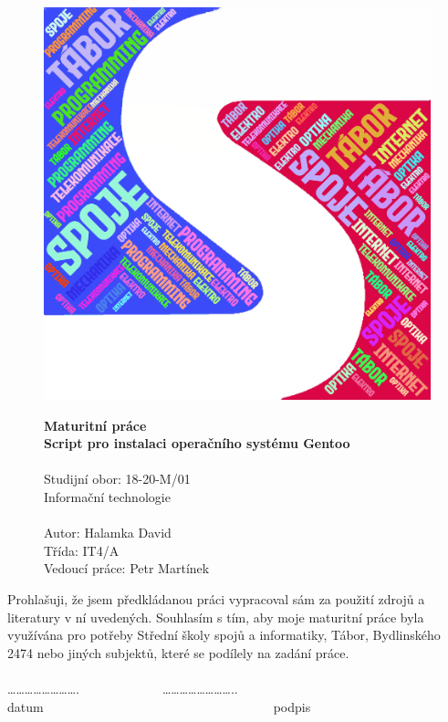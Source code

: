 \documentclass[12pt,a4paper,twoside,]{article}
\begin{document}
\begin{figure}[h!]
\centering
\includegraphics[scale=0.5,]{obrazky/sssi_logo.png}


	
\textsf{\textbf{\Huge Maturitní práce\\}}
\textsf{ \textbf{\Huge Script pro instalaci operačního systému Gentoo \\}}
\textsf{ \Huge \\Studijní obor: 18-20-M/01 \\Informační technologie\\}
\textsf{\LARGE \\Autor: Halamka David\\
Třída: IT4/A\\
Vedoucí práce: Petr Martínek
}
\end{figure}


\newpage
Prohlašuji, že jsem předkládanou práci vypracoval sám za použití zdrojů a literatury v ní uvedených. Souhlasím s tím, aby moje maturitní práce byla využívána pro potřeby Střední školy spojů a informatiky, Tábor, Bydlinského 2474 nebo jiných subjektů, které se podílely na zadání práce.\\ 
\\	…………………….~~~~~~~~~~~~~……………………..\\
datum~~~~~~~~~~~~~~~~~~~~~~~~~~~~~~~~~~~~podpis
\end{document}
